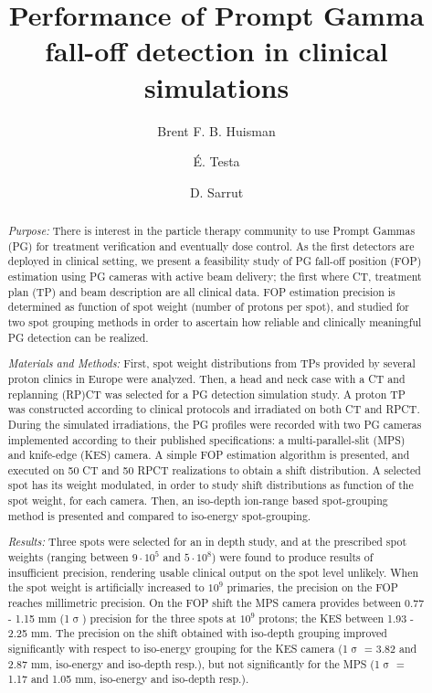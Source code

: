 \documentclass[a4paper,english]{article}
\begin{document}
\title{Performance of Prompt Gamma fall-off detection in clinical simulations}

\author[1,2]{Brent F. B. Huisman}
\author[2]{É. Testa}
\author[1]{D. Sarrut}

\maketitle

\begin{abstract}

\emph{Purpose:} There is interest in the particle therapy community to use Prompt Gammas (PG) for treatment verification and eventually dose control. As the first detectors are deployed in clinical setting, we present a feasibility study of PG fall-off position (FOP) estimation using PG cameras with active beam delivery; the first where CT, treatment plan (TP) and beam description are all clinical data. FOP estimation precision is determined as function of spot weight (number of protons per spot), and studied for two spot grouping methods in order to ascertain how reliable and clinically meaningful PG detection can be realized.

\emph{Materials and Methods:} First, spot weight distributions from TPs provided by several proton clinics in Europe were analyzed. Then, a head and neck case with a CT and replanning (RP)CT was selected for a PG detection simulation study. A proton TP was constructed according to clinical protocols and irradiated on both CT and RPCT. During the simulated irradiations, the PG profiles were recorded with two PG cameras implemented according to their published specifications: a multi-parallel-slit (MPS) and knife-edge (KES) camera. A simple FOP estimation algorithm is presented, and executed on 50 CT and 50 RPCT realizations to obtain a shift distribution. A selected spot has its weight modulated, in order to study shift distributions as function of the spot weight, for each camera. Then, an iso-depth ion-range based spot-grouping method is presented and compared to iso-energy spot-grouping.

\emph{Results:} Three spots were selected for an in depth study, and at the prescribed spot weights (ranging between $9\cdot10^5$ and $5\cdot10^8$) were found to produce results of insufficient precision, rendering usable clinical output on the spot level unlikely. When the spot weight is artificially increased to $10^9$ primaries, the precision on the FOP reaches millimetric precision. On the FOP shift the MPS camera provides between 0.77 - 1.15 mm (1$\upsigma$) precision for the three spots at $10^9$ protons; the KES between 1.93 - 2.25 mm. The precision on the shift obtained with iso-depth grouping improved significantly with respect to iso-energy grouping for the KES camera (1$\upsigma$ = 3.82 and 2.87 mm, iso-energy and iso-depth resp.), but not significantly for the MPS (1$\upsigma$ = 1.17 and 1.05 mm, iso-energy and iso-depth resp.).


\end{abstract}
\end{document}

